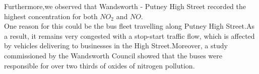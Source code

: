 \documentclass[]{article}
\begin{document}
Furthermore,we observed that  Wandsworth - Putney High Street recorded the highest concentration for both  $NO_2$ and $NO$.\\
One reason for this could be the bus fleet travelling along Putney High Street.As a result, it remains very congested with a stop-start traffic flow, which is affected by vehicles delivering to businesses in the High Street.Moreover, a study commissioned by the Wandsworth Council showed that the buses were responsible for over two thirds of oxides of nitrogen pollution.
\end{document}
